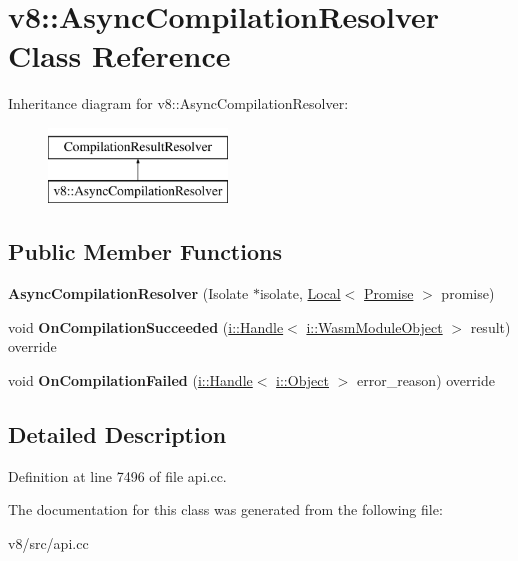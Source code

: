 \hypertarget{classv8_1_1AsyncCompilationResolver}{}\section{v8\+:\+:Async\+Compilation\+Resolver Class Reference}
\label{classv8_1_1AsyncCompilationResolver}
Inheritance diagram for v8\+:\+:Async\+Compilation\+Resolver\+:\begin{figure}[H]
\begin{center}
\leavevmode
\includegraphics[height=2.000000cm]{classv8_1_1AsyncCompilationResolver}
\end{center}
\end{figure}
\subsection*{Public Member Functions}
\begin{DoxyCompactItemize}
\item 
\mbox{\label{classv8_1_1AsyncCompilationResolver_afbb073690886dfb9d508fb168c57e6ba}} 
{\bfseries Async\+Compilation\+Resolver} (Isolate $\ast$isolate, \mbox{\hyperlink{classv8_1_1Local}{Local}}$<$ \mbox{\hyperlink{classv8_1_1Promise}{Promise}} $>$ promise)
\item 
\mbox{\label{classv8_1_1AsyncCompilationResolver_a5eef7c5b1f179d895ad7a86993977fe1}} 
void {\bfseries On\+Compilation\+Succeeded} (\mbox{\hyperlink{classv8_1_1internal_1_1Handle}{i\+::\+Handle}}$<$ \mbox{\hyperlink{classv8_1_1internal_1_1WasmModuleObject}{i\+::\+Wasm\+Module\+Object}} $>$ result) override
\item 
\mbox{\label{classv8_1_1AsyncCompilationResolver_a8623e77a650198796050461b2fd7e4f8}} 
void {\bfseries On\+Compilation\+Failed} (\mbox{\hyperlink{classv8_1_1internal_1_1Handle}{i\+::\+Handle}}$<$ \mbox{\hyperlink{classv8_1_1internal_1_1Object}{i\+::\+Object}} $>$ error\+\_\+reason) override
\end{DoxyCompactItemize}


\subsection{Detailed Description}


Definition at line 7496 of file api.\+cc.



The documentation for this class was generated from the following file\+:\begin{DoxyCompactItemize}
\item 
v8/src/api.\+cc\end{DoxyCompactItemize}

